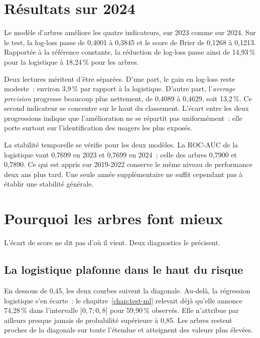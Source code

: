 \section{Résultats sur 2024}


Le modèle d'arbres améliore les quatre indicateurs, sur 2023 comme sur 2024. Sur le test,
la log-loss passe de 0,4001 à 0,3845 et le score de Brier de 0,1268 à 0,1213. Rapportée
à la référence constante, la réduction de log-loss passe ainsi de 14,93\,\% pour la
logistique à 18,24\,\% pour les arbres.

Deux lectures méritent d'être séparées. D'une part, le gain en log-loss reste modeste~:
environ 3,9\,\% par rapport à la logistique. D'autre part, l'\textit{average precision}
progresse beaucoup plus nettement, de 0,4089 à 0,4629, soit 13,2\,\%. Ce second
indicateur se concentre sur le haut du classement. L'écart entre les deux progressions
indique que l'amélioration ne se répartit pas uniformément~: elle porte surtout sur
l'identification des usagers les plus exposés.

La stabilité temporelle se vérifie pour les deux modèles. La ROC-AUC de la logistique
vaut 0,7699 en 2023 et 0,7699 en 2024~; celle des arbres 0,7900 et 0,7890. Ce qui est
appris sur 2019-2022 conserve le même niveau de performance deux ans plus tard. Une
seule année supplémentaire ne suffit cependant pas à établir une stabilité générale.

\section{Pourquoi les arbres font mieux}
L'écart de score ne dit pas d'où il vient. Deux diagnostics le précisent.

\subsection{La logistique plafonne dans le haut du risque}

En dessous de 0,45, les deux courbes suivent la diagonale. Au-delà, la régression
logistique s'en écarte~: le chapitre~\ref{chap:test-ml} relevait déjà qu'elle annonce
74,28\,\% dans l'intervalle $]0{,}7;0{,}8]$ pour 59,90\,\% observés. Elle n'attribue
par ailleurs presque jamais de probabilité supérieure à 0,85. Les arbres restent proches
de la diagonale sur toute l'étendue et atteignent des valeurs plus élevées.

